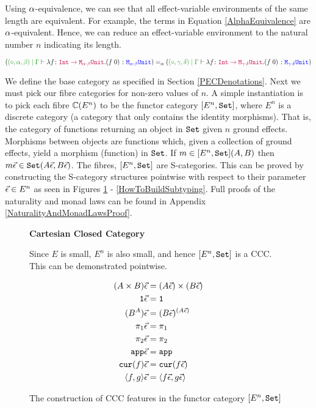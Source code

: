 \documentclass{Report}
\begin{document}
Using $\alpha$-equivalence, we can see that all effect-variable environments of the same length are equivalent. For example, the terms in Equation \ref{AlphaEquivalence} are $\alpha$-equivalent. Hence, we can reduce an effect-variable environment to the natural number $n$ indicating its length.

\begin{equation}\label{AlphaEquivalence}
    \scalebox{.8}{$
    (\etyperelation{(\nil, \a, \b)}{\G}{\lam{f}{\fntype{\texttt{Int}}{\M{\a\dot\b}{\U}}}{(\apply{f}{0})}}{\M{\a\dot\b}{\U}})  =_\a(\etyperelation{(\nil, \g, \d)}{\G}{\lam{f}{\fntype{\texttt{Int}}{\M{\g\dot\d}{\U}}}{(\apply{f}{0})}}{\M{\g\dot\d}{\U}})
    $}
\end{equation}
 
We define the base category as specified in Section \ref{PECDenotations}. Next we must pick our fibre categories for non-zero values of $n$. A simple instantiation is to pick each fibre $\mathbb{C}(E^n)$ to be the functor category $[E^n, \texttt{Set}]$,  where $E^n$ is a discrete category (a category that only contains the identity morphisms). That is, the category of functions returning an object in $\texttt{Set}$ given $n$ ground effects. Morphisms between objects are functions which, given a collection of ground effects, yield a morphism (function) in $\texttt{Set}$. If $m\in [E^n, \texttt{Set}](A, B)$ then $m\vec{\epsilon}\in\texttt{Set}(A\vec{\epsilon}, B\vec{\epsilon})$. The fibres, $[E^n, \texttt{Set}]$ are S-categories. This can be proved by constructing the S-category structures pointwise with respect to their parameter $\vec{\epsilon} \in E^n$ as seen in Figures \ref{HowToBuildCCC} - \ref{HowToBuildSubtyping}. Full proofs of the naturality and monad laws can be found in Appendix \ref{NaturalityAndMonadLawsProof}.



\begin{figure}
    
    \begin{framed}
        \centering\textbf{Cartesian Closed Category}

Since $E$ is small, $E^n$ is also small, and hence $[E^n, \texttt{Set}]$ is a CCC. This can be demonstrated pointwise.

\begin{align*}
    (A\times B)\vec{\epsilon} & = (A\vec{\epsilon})\times(B\vec{\epsilon})\\
    \texttt{1}\vec{\epsilon} & = \texttt{1}\\
    (B^A)\vec{\epsilon} &= (B\vec{\epsilon})^{(A\vec{\epsilon})}\\
    \pi_1\vec{\epsilon} & = \pi_1\\
    \pi_2\vec{\epsilon} & = \pi_2\\
    \texttt{app}\vec{\epsilon} & = \texttt{app}\\
    \texttt{cur}(f)\vec{\epsilon} & = \texttt{cur}(f\vec{\epsilon})\\
    \langle f, g\rangle\vec{\epsilon} & = \langle f\vec{\epsilon}, g\vec{\epsilon}\rangle\\
\end{align*}

\end{framed}
\caption{The construction of CCC features in the functor category $[E^n, \texttt{Set}]$}
\label{HowToBuildCCC}
\end{figure}
\end{document}
